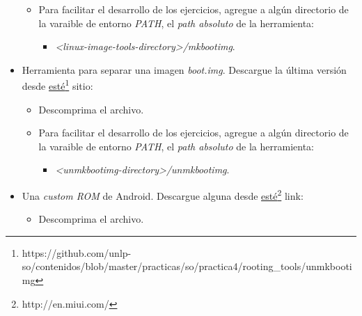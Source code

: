 \begin{itemize}
\begin{itemize}
      \item Para facilitar el desarrollo de los ejercicios, agregue a algún directorio de la varaible de entorno \textit{PATH}, el \textit{path absoluto} de la herramienta:
      \begin{itemize}
  \item \textit{<linux-image-tools-directory>/mkbootimg}.
      \end{itemize}
 \end{itemize}
 
 \item Herramienta para separar una imagen \textit{boot.img}. Descargue la última versión desde \href{https://github.com/unlp-so/contenidos/blob/master/practicas/so/practica4/rooting\_tools/unmkbootimg}{esté}\footnote{https://github.com/unlp-so/contenidos/blob/master/practicas/so/practica4/rooting\_tools/unmkbootimg} sitio:
 \begin{itemize}
      \item Descomprima el archivo.

      \item Para facilitar el desarrollo de los ejercicios, agregue a algún directorio de la varaible de entorno \textit{PATH}, el \textit{path absoluto} de la herramienta:
      \begin{itemize}
  \item \textit{<unmkbootimg-directory>/unmkbootimg}.
      \end{itemize}
 \end{itemize}
 
 \item Una \textit{custom ROM} de Android. Descargue alguna desde \href{http://en.miui.com/}{esté}\footnote{http://en.miui.com/} link:
 \begin{itemize}
      \item Descomprima el archivo.
 \end{itemize} 
\end{itemize}


